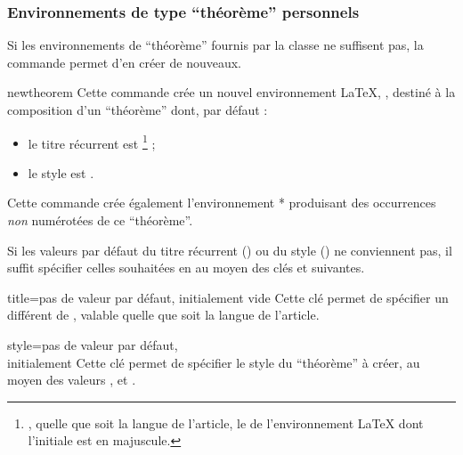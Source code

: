 \subsubsection{Environnements de type \enquote{théorème} personnels}
\label{sec:envir-de-type-1}

Si les environnements de \enquote{théorème} fournis par la classe ne suffisent
pas, la commande  permet d'en créer de nouveaux.

\begin{docCommand}{newtheorem}{}
  Cette commande crée un nouvel environnement \LaTeX{}, , destiné à la
  composition d'un \enquote{théorème} dont, par défaut :
  \begin{itemize}
  \item le titre récurrent est \footnote{\Ie*{}, quelle que soit la
      langue de l'article, le  de l'environnement \LaTeX{} dont
      l'initiale est en majuscule.} ;
  \item le style est .
  \end{itemize}
  Cette commande crée également l'environnement * produisant des
  occurrences \emph{non} numérotées de ce \enquote{théorème}.

  Si les valeurs par défaut du titre récurrent () ou du style
  () ne conviennent pas, il suffit spécifier celles souhaitées
  en  au moyen des clés  et 
  suivantes.
  \begin{docKey}{title}{={}}{pas de
      valeur par défaut, initialement vide}
    Cette clé permet de spécifier un  différent de
    , valable quelle que soit la langue de l'article.
  \end{docKey}
  \begin{docKey}{style}{=\textbar{}\textbar{}}{pas
      de valeur par défaut,\\initialement {}}
    Cette clé permet de spécifier le style du \enquote{théorème} à créer, au
    moyen des valeurs ,  et
    .
  \end{docKey}


\end{docCommand}
